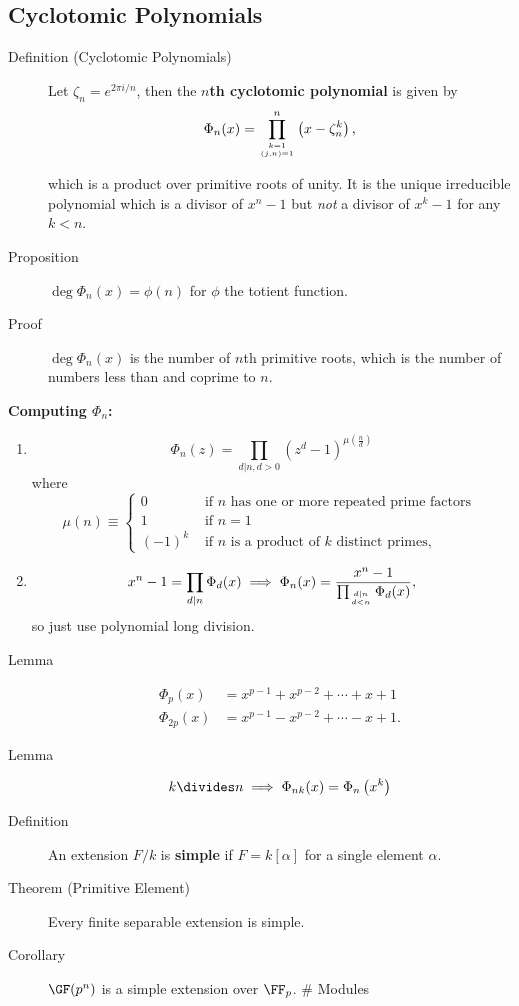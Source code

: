 \hypertarget{cyclotomic-polynomials}{%
\subsection{Cyclotomic Polynomials}\label{cyclotomic-polynomials}}

\begin{description}
\item[Definition (Cyclotomic Polynomials)]
Let \(\zeta_n = e^{2\pi i/n}\), then the \textbf{\(n\)th cyclotomic
polynomial} is given by \[
\Phi_{n}(x)=\prod_{k=1 \atop (j, n)=1}^{n}\left(x- \zeta_n^k\right)
,\]

which is a product over primitive roots of unity. It is the unique
irreducible polynomial which is a divisor of \(x^n - 1\) but \emph{not}
a divisor of \(x^k-1\) for any \(k<n\).
\item[Proposition]
\(\deg \Phi_n(x) = \phi(n)\) for \(\phi\) the totient function.
\item[Proof]
\(\deg \Phi_n(x)\) is the number of \(n\)th primitive roots, which is
the number of numbers less than and coprime to \(n\).
\end{description}

\textbf{Computing \(\Phi_n\):}

\begin{enumerate}
\def\labelenumi{\arabic{enumi}.}
\item
  \[
  \Phi_{n}(z)=\prod_{d | n, d>0}\left(z^{d}-1\right)^{\mu\left(\frac{n}{d}\right)}
  \] where \[
  \mu(n) \equiv\left\{\begin{array}{ll}{0} & {\text { if } n \text { has one or more repeated prime factors }} \\ {1} & {\text { if } n=1} \\ {(-1)^{k}} & {\text { if } n \text { is a product of } k \text { distinct primes, }}\end{array}\right.
  \]
\item
  \[
  x^{n}-1=\prod_{d | n} \Phi_{d}(x) \implies \Phi_n(x) = \frac{x^n-1}{\prod_{d | n \atop d < n} \Phi_{d}(x)},
  \] so just use polynomial long division.
\end{enumerate}

\begin{description}
\item[Lemma]
\hfill

\begin{align*}
\Phi_{p}(x)   &=  x^{p-1}+x^{p-2}+\cdots+x+1 \\
\Phi_{2 p}(x) &=  x^{p-1}-x^{p-2}+\cdots-x+1
.\end{align*}
\item[Lemma]
\hfill

\[
k\divides n \implies \Phi_{n k}(x)=\Phi_{n}\left(x^{k}\right)
\]
\item[Definition]
An extension \(F/k\) is \textbf{simple} if \(F = k[\alpha]\) for a
single element \(\alpha\).
\item[Theorem (Primitive Element)]
Every finite separable extension is simple.
\item[Corollary]
\(\GF(p^n)\) is a simple extension over \(\FF_p\). \# Modules
\end{description}

